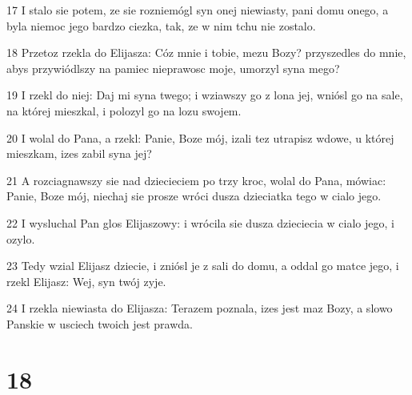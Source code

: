 \par 17 I stalo sie potem, ze sie rozniemógl syn onej niewiasty, pani domu onego, a byla niemoc jego bardzo ciezka, tak, ze w nim tchu nie zostalo.
\par 18 Przetoz rzekla do Elijasza: Cóz mnie i tobie, mezu Bozy? przyszedles do mnie, abys przywiódlszy na pamiec nieprawosc moje, umorzyl syna mego?
\par 19 I rzekl do niej: Daj mi syna twego; i wziawszy go z lona jej, wniósl go na sale, na której mieszkal, i polozyl go na lozu swojem.
\par 20 I wolal do Pana, a rzekl: Panie, Boze mój, izali tez utrapisz wdowe, u której mieszkam, izes zabil syna jej?
\par 21 A rozciagnawszy sie nad dziecieciem po trzy kroc, wolal do Pana, mówiac: Panie, Boze mój, niechaj sie prosze wróci dusza dzieciatka tego w cialo jego.
\par 22 I wysluchal Pan glos Elijaszowy: i wrócila sie dusza dzieciecia w cialo jego, i ozylo.
\par 23 Tedy wzial Elijasz dziecie, i zniósl je z sali do domu, a oddal go matce jego, i rzekl Elijasz: Wej, syn twój zyje.
\par 24 I rzekla niewiasta do Elijasza: Terazem poznala, izes jest maz Bozy, a slowo Panskie w usciech twoich jest prawda.

\chapter{18}

